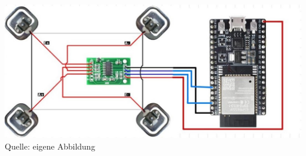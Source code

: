 \documentclass[ngerman,12pt,a4paper]{article}
\begin{document}
		\begin{center}
			\begin{minipage}{1\textwidth}
				\centering
				\includegraphics[width=\textwidth]{Pictures/hx711_verkabelung}
				\label{fig:hx711_verkabelung}
				\vspace{-3pt}
				{\small Quelle: {eigene Abbildung}}
			\end{minipage}
		\end{center}
		
\end{document}
